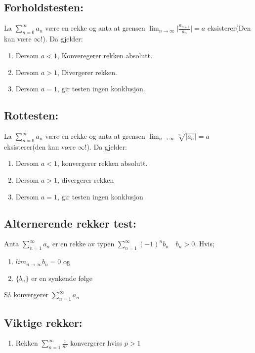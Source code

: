 \documentclass[8pt,a4paper,twocolumn,twoside]{article}
\def\abs#1{\lvert #1 \rvert}
\def\suminfty#1#2{\sum_{n=#1}^\infty #2}
\begin{document}
        \subsection*{Forholdstesten:}
        La $\suminfty{0}{a_n}$ være en rekke og anta at grensen $\lim_{n\to\infty}\abs{\frac{a_{n+1}}{a_n}}=a$ eksisterer(Den kan være $\infty$!). Da gjelder:
        \begin{enumerate}
            \item Dersom $a<1$, Konveregerer rekken absolutt.
            \item Dersom $a>1$, Divergerer rekken.
            \item Dersom $a=1$, gir testen ingen konklusjon.
        \end{enumerate}
        \subsection*{Rottesten:}
        La $\suminfty{0}{a_n}$ være en rekke og anta at grensen $\lim_{n\to\infty}\sqrt[n]{\abs{a_n}}=a$ eksisterer(den kan være $\infty$!). Da gjelder:
        \begin{enumerate}
            \item Dersom $a<1$, konvergerer rekken absolutt.
            \item Dersom $a>1$, divergerer rekken
            \item Dersom $a=1$, gir testen ingen konklusjon
        \end{enumerate}
        \subsection*{Alternerende rekker test:}
        Anta $\suminfty{1}{a_n}$ er en rekke av typen $\suminfty{1}{(-1)^n b_n}\quad b_n>0$. Hvis;
        \begin{enumerate}
            \item $lim_{n\to\infty}b_n=0$ og
            \item $\{b_n\}$ er en synkende følge
        \end{enumerate}
        Så konvergerer $\suminfty{1}{a_n}$
        \subsection*{Viktige rekker:}
        \begin{enumerate}
            \item Rekken $\sum_{n=1}^\infty \frac{1}{n^p}$ konvergerer hviss $p > 1$ 
        \end{enumerate}
\end{document}
